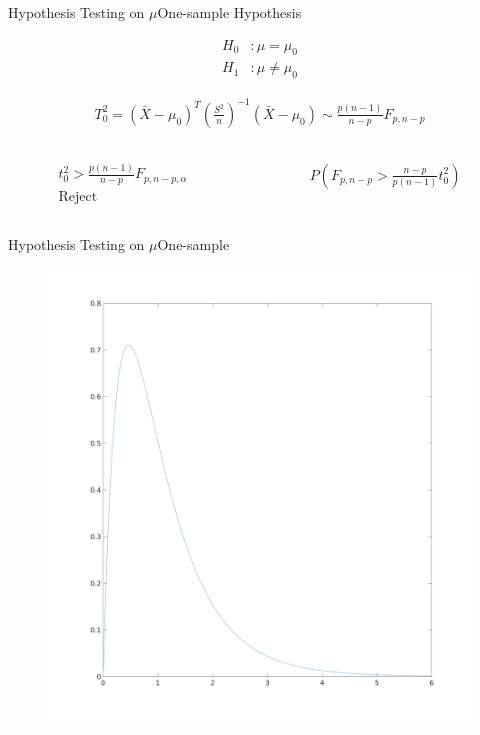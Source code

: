 \documentclass[aspectratio=169,10pt,t]{beamer}
\begin{document}
\begin{frame}{Hypothesis Testing on $\mu$}{One-sample}
	Hypothesis

	\begin{align*}
		H_0&: \mu = \mu_0\\
		H_1&: \mu \neq \mu_0
	\end{align*}

	\begin{align*}
		T^2_0 = ( \bar{X} - \mu_0)^{T} \left(\frac{S^2}{n}\right)^{-1} ( \bar{X} -\mu_0 ) \sim \frac{p(n-1)}{n-p} F_{p,n-p}
	\end{align*}

	\begin{columns}
		\begin{column}{0.5\textwidth}
			\begin{align*}
				t^2_0 > \frac{p(n-1)}{n-p} F_{p,n-p,\alpha } \\
				\text{Reject}
			\end{align*}
		\end{column}
		\begin{column}{0.5\textwidth}
			\begin{align*}
				P( F_{p,n-p} > \frac{n-p}{p(n-1)} t_0^2 )
			\end{align*}
		\end{column}
	\end{columns}



\end{frame}

\begin{frame}{Hypothesis Testing on $\mu$}{One-sample}
	\begin{figure}[H]
		\centering
		\includegraphics[scale=0.15]{images/f.png}
	\end{figure} 
\end{frame}
\end{document}
